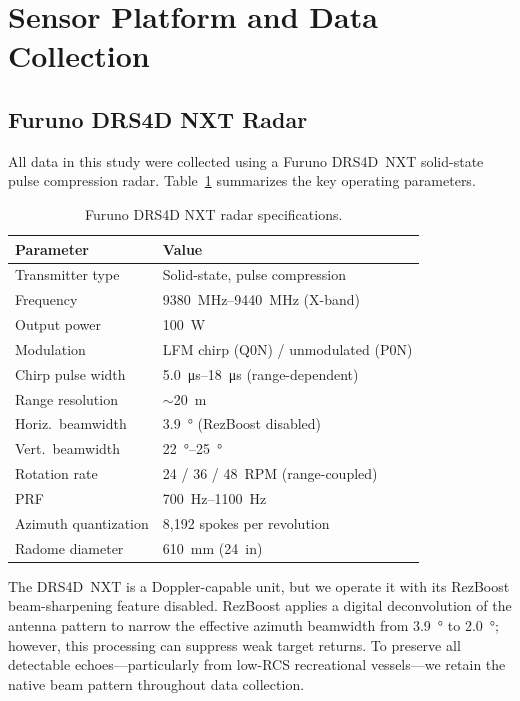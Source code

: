 \documentclass[twocolumn, 10pt]{article}
\begin{document}
\section{Sensor Platform and Data Collection}
\label{sec:sensor}

\subsection{Furuno DRS4D NXT Radar}

All data in this study were collected using a Furuno DRS4D~NXT solid-state pulse compression radar. Table~\ref{tab:radar_specs} summarizes the key operating parameters.

\begin{table}[htb]
\centering
\caption{Furuno DRS4D NXT radar specifications.}
\label{tab:radar_specs}
\begin{tabular}{@{}ll@{}}
\toprule
\textbf{Parameter} & \textbf{Value} \\
\midrule
Transmitter type & Solid-state, pulse compression \\
Frequency & \SIrange{9380}{9440}{\mega\hertz} (X-band) \\
Output power & \SI{100}{\watt} \\
Modulation & LFM chirp (Q0N) / unmodulated (P0N) \\
Chirp pulse width & \SIrange{5.0}{18}{\micro\second} (range-dependent) \\
Range resolution & $\sim$\SI{20}{\meter} \\
Horiz.\ beamwidth & \SI{3.9}{\degree} (RezBoost disabled) \\
Vert.\ beamwidth & \SIrange{22}{25}{\degree} \\
Rotation rate & 24 / 36 / 48~RPM (range-coupled) \\
PRF & \SIrange{700}{1100}{\hertz} \\
Azimuth quantization & 8{,}192 spokes per revolution \\
Radome diameter & \SI{610}{\milli\meter} (24~in) \\
\bottomrule
\end{tabular}
\end{table}

The DRS4D~NXT is a Doppler-capable unit, but we operate it with its RezBoost beam-sharpening feature disabled. RezBoost applies a digital deconvolution of the antenna pattern to narrow the effective azimuth beamwidth from \SI{3.9}{\degree} to \SI{2.0}{\degree}; however, this processing can suppress weak target returns. To preserve all detectable echoes---particularly from low-RCS recreational vessels---we retain the native beam pattern throughout data collection.
\end{document}

